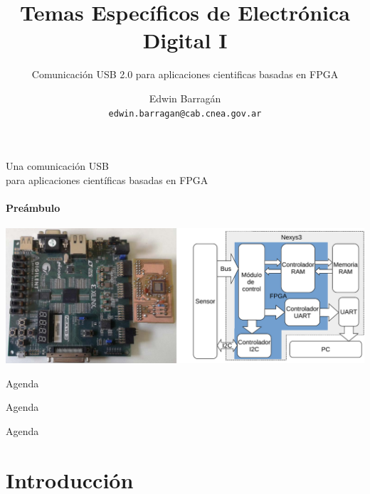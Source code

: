 \documentclass[11pt,a4paper]{beamer}
\author[E. Barragán]{Edwin Barragán\\ \texttt{edwin.barragan@cab.cnea.gov.ar}}
\title{Temas Específicos de Electrónica Digital I}
\subtitle{Comunicación USB 2.0 para aplicaciones cientificas basadas en FPGA}
\institute[UNSJ-FI]{Universidad Nacional de San Juan\\Facultad de Ingeniería}
\begin{document}
	\titlepage
	\begin{frame}[c]{Una comunicación USB\\para aplicaciones científicas basadas en FPGA}
		\framesubtitle{Preámbulo}
		\centering
		\includegraphics[width=0.9\paperwidth]{01motivacion}
	\end{frame}
	\begin{frame}{Agenda}
		\tableofcontents[hideallsubsections]
	\end{frame}
	\begin{frame}{Agenda}
		\tableofcontents[sections={1,2}]
	\end{frame}
	\begin{frame}{Agenda}
		\tableofcontents[sections={3,4}]
	\end{frame}
	\section{Introducción}
\end{document}

